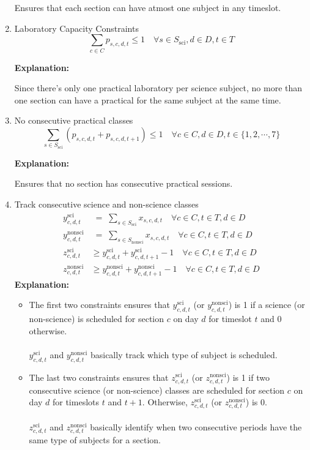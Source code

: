 \documentclass[11pt]{article}
\begin{document}
\begin{enumerate}
    Ensures that each section can have atmost one subject in any timeslot.

    \item Laboratory Capacity Constraints
    \[
        \sum_{c \in C} p_{s,c,d,t} \leq 1  \quad \forall s \in S_{\text{sci}}, d \in D, t \in T
    \]

    \textbf{Explanation:}

    Since there's only one practical laboratory per science subject, no more than one section can have a practical for the same subject at the same time.

    \item No consecutive practical classes
    \[
    \sum_{s \in S_{\text{sci}}} (p_{s,c,d,t} + p_{s,c,d,t+1}) \leq 1 \quad \forall c \in C, d \in D, t \in \{1,2,\cdots,7\}
    \]

    \textbf{Explanation:}

    Ensures that no section has consecutive practical sessions.

    \item Track consecutive science and non-science classes
    \begin{align*}
        y^{\mathrm{sci}}_{c,d,t} &\;=\; \sum_{s\in S_{\mathrm{sci}}} x_{s,c,d,t} \quad \forall c \in C, t \in T, d \in D\\
        y^{\mathrm{nonsci}}_{c,d,t} &\;=\; \sum_{s\in S_{\mathrm{nonsci}}} x_{s,c,d,t} \quad \forall c \in C, t \in T, d \in D\\
        z^{\mathrm{sci}}_{c,d,t} &\ge y^{\mathrm{sci}}_{c,d,t}+y^{\mathrm{sci}}_{c,d,t+1}-1 \quad \forall c \in C, t \in T, d \in D\\
        z^{\mathrm{nonsci}}_{c,d,t} &\ge y^{\mathrm{nonsci}}_{c,d,t}+y^{\mathrm{nonsci}}_{c,d,t+1}-1 \quad \forall c \in C, t \in T, d \in D
    \end{align*}
      \textbf{Explanation:}
      \begin{itemize}
        \item The first two constraints ensures that \(y^{\mathrm{sci}}_{c,d,t}\) (or \(y^{\mathrm{nonsci}}_{c,d,t}\)) is 1 if a science (or non-science) is scheduled for section \(c\) on day \(d\) for timeslot \(t\) and 0 otherwise.\\\\
        \(y^{\mathrm{sci}}_{c,d,t}\) and \(y^{\mathrm{nonsci}}_{c,d,t}\) basically track which type of subject is scheduled.

        \item The last two constraints ensures that \(z^{\mathrm{sci}}_{c,d,t}\) (or \(z^{\mathrm{nonsci}}_{c,d,t}\)) is 1 if two consecutive science (or non-science) classes are scheduled for section \(c\) on day \(d\) for timeslots \(t\) and \(t+1\). Otherwise,  \(z^{\mathrm{sci}}_{c,d,t}\) (or \(z^{\mathrm{nonsci}}_{c,d,t}\)) is 0.\\\\
        \(z^{\mathrm{sci}}_{c,d,t}\) and \(z^{\mathrm{nonsci}}_{c,d,t}\) basically identify when two consecutive periods have the same type of subjects for a section.
      \end{itemize}


\end{enumerate}
\end{document}
